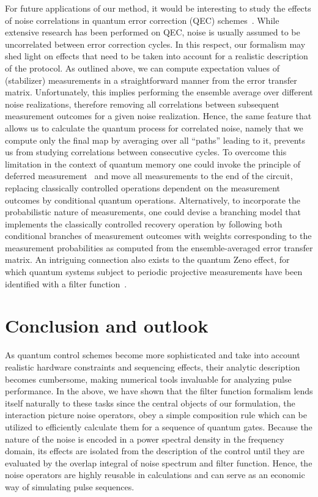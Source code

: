 For future applications of our method, it would be interesting to study the effects of noise correlations in quantum error correction (QEC) schemes~\cite{Devitt2013,Ng2011,Nickerson2019}.
While extensive research has been performed on QEC, noise is usually assumed to be uncorrelated between error correction cycles.
In this respect, our formalism may shed light on effects that need to be taken into account for a realistic description of the protocol.
As outlined above, we can compute expectation values of (stabilizer) measurements in a straightforward manner from the error transfer matrix.
Unfortunately, this implies performing the ensemble average over different noise realizations, therefore removing all correlations between subsequent measurement outcomes for a given noise realization.
Hence, the same feature that allows us to calculate the quantum process for correlated noise, namely that we compute only the final map by averaging over all \enquote{paths} leading to it, prevents us from studying correlations between consecutive cycles.
To overcome this limitation in the context of quantum memory one could invoke the principle of deferred measurement~\cite{Nielsen2011} and move all measurements to the end of the circuit, replacing classically controlled operations dependent on the measurement outcomes by conditional quantum operations.
Alternatively, to incorporate the probabilistic nature of measurements, one could devise a branching model that implements the classically controlled recovery operation by following both conditional branches of measurement outcomes with weights corresponding to the measurement probabilities as computed from the ensemble-averaged error transfer matrix.
An intriguing connection also exists to the quantum Zeno effect, for which quantum systems subject to periodic projective measurements have been identified with a filter function~\cite{Kofman2000,Kofman2001,Chaudhry2016}.

\chapter{Conclusion and outlook}\label{ch:ff:conclusion}
As quantum control schemes become more sophisticated and take into account realistic hardware constraints and sequencing effects, their analytic description becomes cumbersome, making numerical tools invaluable for analyzing pulse performance.
In the above, we have shown that the filter function formalism lends itself naturally to these tasks since the central objects of our formulation, the interaction picture noise operators, obey a simple composition rule which can be utilized to efficiently calculate them for a sequence of quantum gates.
Because the nature of the noise is encoded in a power spectral density in the frequency domain, its effects are isolated from the description of the control until they are evaluated by the overlap integral of noise spectrum and filter function.
Hence, the noise operators are highly reusable in calculations and can serve as an economic way of simulating pulse sequences.

